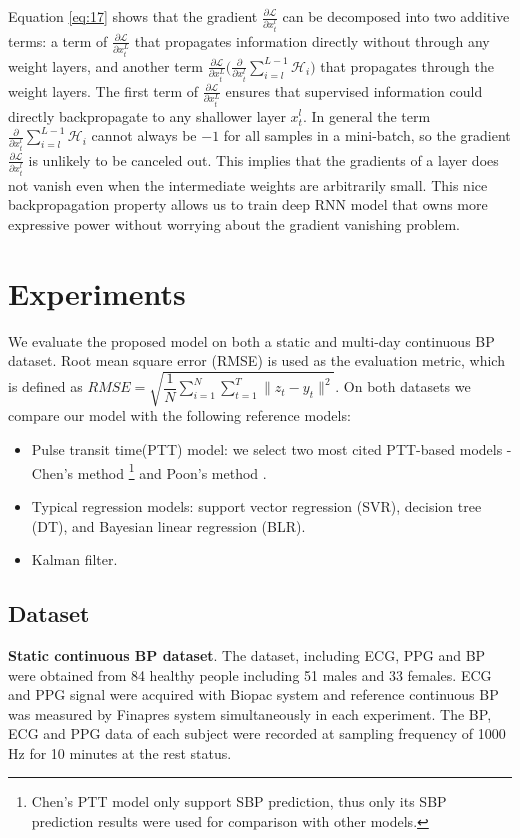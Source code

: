\documentclass[letterpaper, 10 pt, conference]{ieeeconf}
\begin{document}
Equation \ref{eq:17} shows that the gradient $\frac{\partial \mathcal{L}}{\partial x_t^{l}}  $ can be decomposed into two additive terms: a term of $ \frac{\partial \mathcal{L}}{\partial x_t^{L}} $ that propagates information directly without through any weight layers, and another term $\frac{\partial \mathcal{L}}{\partial x_t^{L}} \big( \frac{\partial}{\partial x_t^{l}} \sum_{i=l}^{L-1} \mathcal{H}_{i} \big) $ that propagates through the weight layers.
The first term of  $ \frac{\partial \mathcal{L}}{\partial x_t^{L}} $  ensures that supervised information could directly backpropagate to any shallower layer $x_t^{l}  $.
In general the term $\frac{\partial}{\partial x_t^{l}} \sum_{i=l}^{L-1} \mathcal{H}_{i}  $ cannot always be $-1$ for all samples in a mini-batch, so the gradient $\frac{\partial \mathcal{L}}{\partial x_t^{l}}  $ is unlikely to be canceled out.
This implies that the gradients of a layer does not vanish even when the intermediate weights are arbitrarily small.
This nice backpropagation property allows us to train deep RNN model that owns more expressive power without worrying about the gradient vanishing problem.


\section{Experiments}
We evaluate the proposed model on both a static and multi-day continuous BP dataset.
Root mean square error (RMSE) is used as the evaluation metric, which is defined as $ RMSE = \sqrt {\dfrac{1}{N} \sum_{i=1}^{N} \sum_{t=1}^{T}\lVert z_t -y_t \rVert ^2} $.
On both datasets we compare our model with the following reference models:
\begin{itemize}
\item
Pulse transit time(PTT) model: we select two most cited PTT-based models - Chen's method \cite{chen2000continuous} \footnote{Chen's PTT model only support SBP prediction, thus only its SBP prediction results were used for comparison with other models.} and Poon's method \cite{poon2006cuff}. 
\item
Typical regression models: support vector regression (SVR), decision tree (DT), and Bayesian linear regression (BLR).
\item
Kalman filter.
\end{itemize}
\subsection{Dataset}
\textbf{Static continuous BP dataset}.
The dataset, including ECG, PPG and BP were obtained from 84 healthy people including
51 males and 33 females.
ECG and PPG signal were acquired with Biopac system and reference continuous BP was measured by Finapres system simultaneously in each experiment.
The BP, ECG and PPG data of each subject were recorded at sampling frequency of 1000 Hz for 10 minutes at the rest status.
\end{document}
